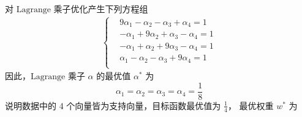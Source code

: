 	对 $ \mathrm{Lagrange} $ 乘子优化产生下列方程组
	\begin{align*}
	\left\{
	\begin{aligned}
	&9 \alpha_1 - \alpha_2   - \alpha_3   + \alpha_4   = 1 \\
	&-\alpha_1  + 9 \alpha_2 + \alpha_3   - \alpha_4   = 1 \\
	&-\alpha_1  + \alpha_2   + 9 \alpha_3 - \alpha_4   = 1 \\
	&\alpha_1   - \alpha_2   - \alpha_3   + 9 \alpha_4 = 1 \\
	\end{aligned}
	\right.
	\end{align*}
	因此，$ \mathrm{Lagrange} $ 乘子 $\alpha$ 的最优值 $\alpha^*$ 为
	\[
	\alpha_1 = \alpha_2 = \alpha_3 = \alpha_4 = \frac{1}{8}
	\]
	说明数据中的 4 个向量皆为支持向量，目标函数最优值为 $\frac{1}{4} $，
	最优权重 $w^*$ 为
